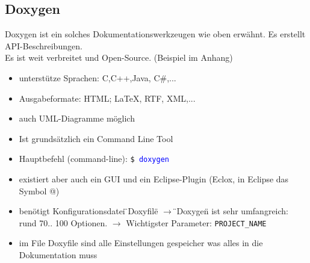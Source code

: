 \subsection{Doxygen}
Doxygen ist ein solches Dokumentationswerkzeugen wie oben erwähnt. Es erstellt API-Beschreibungen.\\
Es ist weit verbreitet und Open-Source. (Beispiel im Anhang)
\begin{itemize}
	\item unterstütze Sprachen: C,C++,Java, C\#,...
	\item Ausgabeformate: HTML; LaTeX, RTF, XML,...
	\item auch UML-Diagramme möglich
	\item Ist grundsätzlich ein Command Line Tool
	\item Hauptbefehl (command-line): \texttt{\$ \textcolor{blue}{doxygen}}
	\item existiert aber auch ein GUI und ein Eclipse-Plugin (Eclox, in Eclipse das Symbol @)
	\item benötigt Konfigurationsdatei \"{}Doxyfile\"{} \newline
	 $\rightarrow$ \"{}Doxygen\"{} ist sehr umfangreich: rund 70.. 100 Optionen. \newline $\rightarrow$ Wichtigster Parameter: \texttt{PROJECT\_NAME} 
	\item im File Doxyfile sind alle Einstellungen gespeicher was alles in die Dokumentation muss
\end{itemize}
